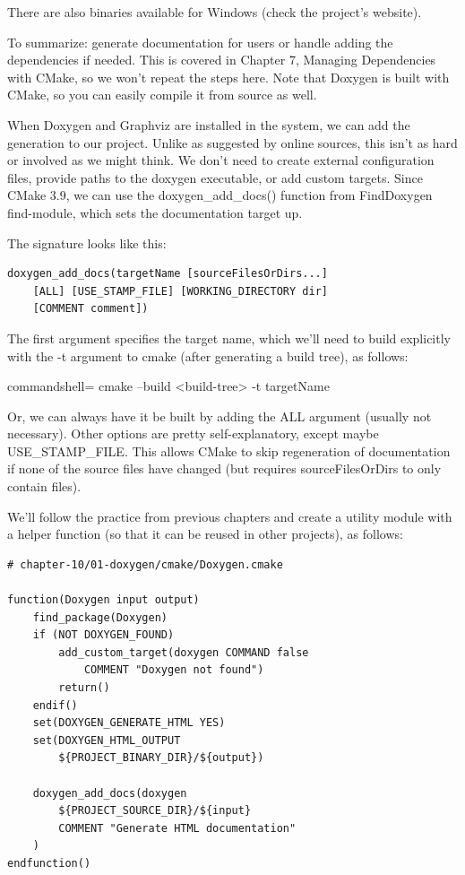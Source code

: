 There are also binaries available for Windows (check the project's website).

To summarize: generate documentation for users or handle adding the dependencies if needed. This is covered in Chapter 7, Managing Dependencies with CMake, so we won't repeat the steps here. Note that Doxygen is built with CMake, so you can easily compile it from source as well.

When Doxygen and Graphviz are installed in the system, we can add the generation to our project. Unlike as suggested by online sources, this isn't as hard or involved as we might think. We don't need to create external configuration files, provide paths to the doxygen executable, or add custom targets. Since CMake 3.9, we can use the doxygen\_add\_docs() function from FindDoxygen find-module, which sets the documentation target up.

The signature looks like this:

\begin{lstlisting}[style=styleCMake]
doxygen_add_docs(targetName [sourceFilesOrDirs...]
	[ALL] [USE_STAMP_FILE] [WORKING_DIRECTORY dir]
	[COMMENT comment])
\end{lstlisting}

The first argument specifies the target name, which we'll need to build explicitly with the -t argument to cmake (after generating a build tree), as follows:

\begin{tcblisting}{commandshell={}}
cmake --build <build-tree> -t targetName
\end{tcblisting}

Or, we can always have it be built by adding the ALL argument (usually not necessary). Other options are pretty self-explanatory, except maybe USE\_STAMP\_FILE. This allows CMake to skip regeneration of documentation if none of the source files have changed (but requires sourceFilesOrDirs to only contain files).

We'll follow the practice from previous chapters and create a utility module with a helper function (so that it can be reused in other projects), as follows:

\begin{lstlisting}[style=styleCMake]
# chapter-10/01-doxygen/cmake/Doxygen.cmake

function(Doxygen input output)
	find_package(Doxygen)
	if (NOT DOXYGEN_FOUND)
		add_custom_target(doxygen COMMAND false
			COMMENT "Doxygen not found")
		return()
	endif()
	set(DOXYGEN_GENERATE_HTML YES)
	set(DOXYGEN_HTML_OUTPUT
		${PROJECT_BINARY_DIR}/${output})
		
	doxygen_add_docs(doxygen
		${PROJECT_SOURCE_DIR}/${input}
		COMMENT "Generate HTML documentation"
	)
endfunction()
\end{lstlisting}


